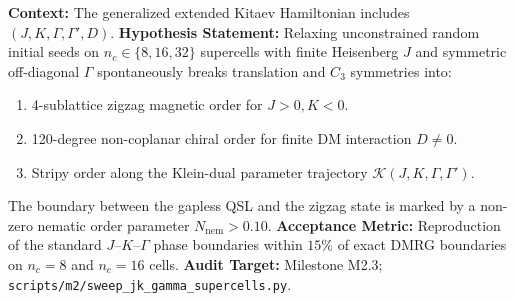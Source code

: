 \begin{contract}
\label{con:h5_competing_orders}
\textbf{Context:} The generalized extended Kitaev Hamiltonian includes $(J, K, \Gamma, \Gamma', D)$.
\textbf{Hypothesis Statement:} Relaxing unconstrained random initial seeds on $n_c \in \{8, 16, 32\}$ supercells with finite Heisenberg $J$ and symmetric off-diagonal $\Gamma$ spontaneously breaks translation and $C_3$ symmetries into:
\begin{enumerate}
\item 4-sublattice zigzag magnetic order for $J > 0, K < 0$.
\item 120-degree non-coplanar chiral order for finite DM interaction $D \neq 0$.
\item Stripy order along the Klein-dual parameter trajectory $\mathcal{K}(J, K, \Gamma, \Gamma')$.
\end{enumerate}
The boundary between the gapless QSL and the zigzag state is marked by a non-zero nematic order parameter $N_{\mathrm{nem}} > 0.10$.
\textbf{Acceptance Metric:} Reproduction of the standard $J$--$K$--$\Gamma$ phase boundaries within $15\%$ of exact DMRG boundaries on $n_c=8$ and $n_c=16$ cells.
\textbf{Audit Target:} Milestone M2.3; \texttt{scripts/m2/sweep\_jk\_gamma\_supercells.py}.
\end{contract}

